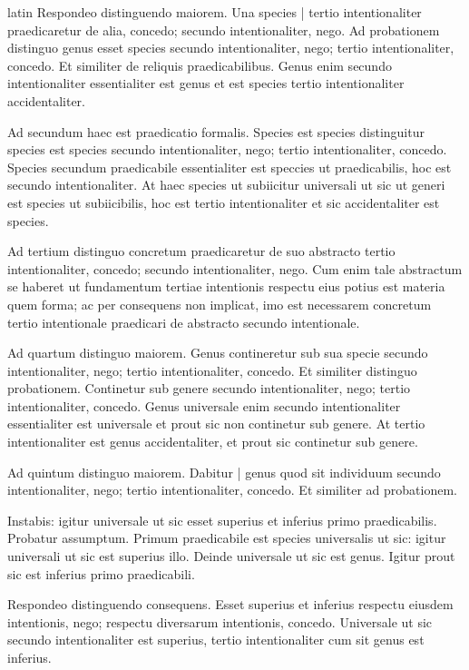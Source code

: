 \begin{otherlanguage*}{latin}
\pstart
  Respondeo distinguendo maiorem. Una species \textnormal{|}   tertio intentionaliter praedicaretur de alia, concedo; secundo intentionaliter, nego. Ad probationem distinguo genus esset species secundo intentionaliter, nego; tertio intentionaliter, concedo. Et similiter de reliquis praedicabilibus. Genus enim secundo intentionaliter essentialiter est genus et est species tertio intentionaliter accidentaliter. 
\pend

\pstart
  Ad secundum haec est praedicatio formalis. Species est species distinguitur species est species secundo intentionaliter, nego; tertio intentionaliter, concedo. Species secundum praedicabile essentialiter est speccies ut praedicabilis, hoc est secundo intentionaliter. At haec species ut subiicitur universali ut sic ut generi est species ut subiicibilis, hoc est tertio intentionaliter et sic accidentaliter est species. 
\pend

\pstart
  Ad tertium distinguo concretum praedicaretur de suo abstracto tertio intentionaliter, concedo; secundo intentionaliter, nego. Cum enim tale abstractum se haberet ut fundamentum tertiae intentionis respectu eius potius est materia quem forma; ac per consequens non implicat, imo est necessarem concretum tertio intentionale praedicari de abstracto secundo intentionale. 
\pend

\pstart
  Ad quartum distinguo maiorem. Genus contineretur sub sua specie secundo intentionaliter, nego; tertio intentionaliter, concedo. Et similiter distinguo probationem. Continetur sub genere secundo intentionaliter, nego; tertio intentionaliter, concedo. Genus universale enim secundo intentionaliter essentialiter est universale et prout sic non continetur sub genere. At tertio intentionaliter est genus accidentaliter, et prout sic continetur sub genere. 
\pend

\pstart
  Ad quintum distinguo maiorem. Dabitur \textnormal{|} genus quod sit individuum secundo intentionaliter, nego; tertio intentionaliter, concedo. Et similiter ad probationem. 
\pend

\pstart
  Instabis: igitur universale ut sic esset superius et inferius primo praedicabilis. Probatur assumptum. Primum praedicabile est species universalis ut sic: igitur universali ut sic est superius illo. Deinde universale ut sic est genus. Igitur prout sic est inferius primo praedicabili. 
\pend

\pstart
  Respondeo distinguendo consequens. Esset superius et inferius respectu eiusdem intentionis, nego; respectu diversarum intentionis, concedo. Universale ut sic secundo intentionaliter est superius, tertio intentionaliter cum sit genus est inferius. 
\pend


\end{otherlanguage*}
